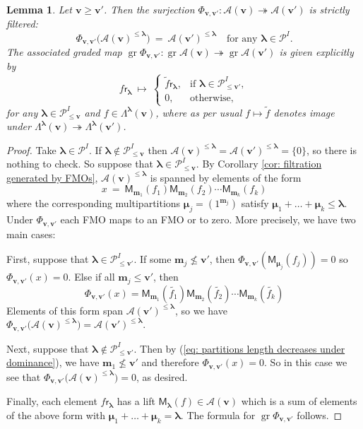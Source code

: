 \documentclass[11pt,reqno]{amsart}
\renewcommand{\mathbf}{\mathbold}
\numberwithin{equation}{section}
\newtheorem{Lemma}[equation]{Lemma}
\theoremstyle{definition}
\newcommand{\cA}{\mathcal{A}}
\newcommand{\cP}{\mathcal{P}}
\newcommand{\bm}{\mathbf{m}}
\newcommand{\bv}{\mathbf{v}}
\renewcommand{\tilde}[1]{\widetilde{#1}}
\DeclareMathOperator{\gr}{gr}
\renewcommand{\bv}{\mathbf{v}} %
\newcommand{\M}{\mathsf{M}}
\newcommand{\sfr}{{\mathsf{r}}}
\newcommand{\vertexset}{I}
\newcommand{\GT}{\Lambda}
\newcommand{\Partitions}{\cP}
\newcommand{\bla}{{\boldsymbol{\lambda}}}
\newcommand{\bmu}{{\boldsymbol{\mu}}}
\newcommand{\qzast}{\cA}
\begin{document}
\begin{Lemma}
\label{lem:surjectionsarefilt}
Let $\bv \geq\bv'$. Then the surjection $\Phi_{\bv, \bv'}: \qzast(\bv)  \twoheadrightarrow \qzast(\bv')$ is {strictly} filtered:
$$
\Phi_{\bv, \bv'}\big( \qzast(\bv)^{\leq \bla} \big) \ = \ \qzast(\bv')^{\leq \bla} \quad \text{for any } \bla \in \Partitions^\vertexset.
$$
The associated graded map $\gr \Phi_{\bv,\bv'} : \gr \qzast(\bv) \twoheadrightarrow \gr \qzast(\bv')$ is given explicitly by 
$$
f \sfr_{\bla} \ \longmapsto \ \left\{ \begin{array}{cl} \tilde{f} \sfr_{\bla}, & \text{if } \bla \in \Partitions_{\leq \bv'}^\vertexset, \\ 0, & \text{otherwise,}\end{array} \right.
$$
for any $\bla \in \Partitions_{\leq \bv}^\vertexset$ and $f\in \GT^{\bla}(\bv)$, where as per usual $f\mapsto \tilde{f}$ denotes image under $\GT^{\bla}(\bv) \twoheadrightarrow \GT^{\bla}(\bv')$.
\end{Lemma}
\begin{proof}
Take $\bla \in \Partitions^\vertexset$. If $\bla \notin \Partitions_{\leq \bv}^\vertexset$ then $\qzast(\bv)^{\leq \bla} = \qzast(\bv')^{\leq \bla} =\{ 0\}$, so there is nothing to check.  So suppose that $\bla \in \Partitions_{\leq \bv}^\vertexset$.   By Corollary \ref{cor: filtration generated by FMOs}, $\qzast(\bv)^{\leq \bla}$ is spanned by elements of the form
$$
x \ = \ \M_{\bm_1}(f_1) \M_{\bm_2}(f_2) \cdots \M_{\bm_k}(f_k)
$$
where the corresponding multipartitions $\bmu_j = (1^{\bm_j})$ satisfy $\bmu_1+\ldots + \bmu_k \leq \bla$.  Under $\Phi_{\bv,\bv'}$ each FMO maps to an FMO or to zero.  More precisely, we have two main cases:

First, suppose that  $\bla \in \Partitions_{\leq \bv'}^\vertexset$. If some $\bm_j \not\leq \bv'$, then $\Phi_{\bv,\bv'}( \M_{\bmu_j}(f_j)) = 0$ so $\Phi_{\bv, \bv'}(x) = 0$.  Else if all $\bm_j \leq \bv'$, then 
$$
\Phi_{\bv,\bv'}(x) = \M_{\bm_1}(\widetilde{f_1}) \M_{\bm_2}(\widetilde{f_2}) \cdots \M_{\bm_k}(\widetilde{f_k})
$$
Elements of this form span $\qzast(\bv')^{\leq \bla}$, so we have $\Phi_{\bv, \bv'}\big( \qzast(\bv)^{\leq \bla} \big) =  \qzast(\bv')^{\leq \bla} $.

Next, suppose that $\bla \notin \Partitions_{\leq \bv'}^\vertexset$.  Then by (\ref{eq: partitions length decreases under dominance}), we have $\bm_1 \not\leq \bv'$ and therefore  $\Phi_{\bv,\bv'}(x) = 0$.  So in this case we see that $\Phi_{\bv,\bv'}\big( \qzast(\bv)^{\leq \bla}\big) = 0$, as desired.

Finally, each element $f \sfr_{\bla}$ has a lift $\M_\bla(f) \in \qzast(\bv)$ which is a sum of elements of the above form with $\bmu_1 + \ldots + \bmu_k = \bla$. The formula for $\gr \Phi_{\bv,\bv'}$ follows.
\end{proof}
\end{document}

